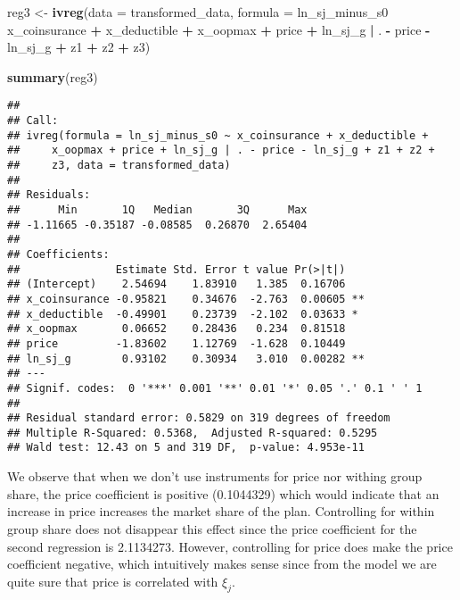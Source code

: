 \documentclass[]{article}
\newenvironment{Shaded}{\begin{snugshade}}{\end{snugshade}}
\newcommand{\DataTypeTok}[1]{\textcolor[rgb]{0.13,0.29,0.53}{#1}}
\newcommand{\KeywordTok}[1]{\textcolor[rgb]{0.13,0.29,0.53}{\textbf{#1}}}
\newcommand{\NormalTok}[1]{#1}
\newcommand{\OperatorTok}[1]{\textcolor[rgb]{0.81,0.36,0.00}{\textbf{#1}}}
\newcommand{\StringTok}[1]{\textcolor[rgb]{0.31,0.60,0.02}{#1}}
\begin{document}
\begin{Shaded}
\begin{Highlighting}[]
\NormalTok{reg3 <-}\StringTok{ }\KeywordTok{ivreg}\NormalTok{(}\DataTypeTok{data =}\NormalTok{ transformed_data, }
      \DataTypeTok{formula =}\NormalTok{ ln_sj_minus_s0 }\OperatorTok{~}\StringTok{ }\NormalTok{x_coinsurance }\OperatorTok{+}\StringTok{ }\NormalTok{x_deductible }\OperatorTok{+}\StringTok{ }\NormalTok{x_oopmax }\OperatorTok{+}\StringTok{ }\NormalTok{price }\OperatorTok{+}\StringTok{ }\NormalTok{ln_sj_g }\OperatorTok{|}\StringTok{ }\NormalTok{. }\OperatorTok{-}\StringTok{ }\NormalTok{price }\OperatorTok{-}\StringTok{ }\NormalTok{ln_sj_g }\OperatorTok{+}\StringTok{ }\NormalTok{z1 }\OperatorTok{+}\StringTok{ }\NormalTok{z2 }\OperatorTok{+}\StringTok{ }\NormalTok{z3)}

\KeywordTok{summary}\NormalTok{(reg3)}
\end{Highlighting}
\end{Shaded}

\begin{verbatim}
## 
## Call:
## ivreg(formula = ln_sj_minus_s0 ~ x_coinsurance + x_deductible + 
##     x_oopmax + price + ln_sj_g | . - price - ln_sj_g + z1 + z2 + 
##     z3, data = transformed_data)
## 
## Residuals:
##      Min       1Q   Median       3Q      Max 
## -1.11665 -0.35187 -0.08585  0.26870  2.65404 
## 
## Coefficients:
##               Estimate Std. Error t value Pr(>|t|)   
## (Intercept)    2.54694    1.83910   1.385  0.16706   
## x_coinsurance -0.95821    0.34676  -2.763  0.00605 **
## x_deductible  -0.49901    0.23739  -2.102  0.03633 * 
## x_oopmax       0.06652    0.28436   0.234  0.81518   
## price         -1.83602    1.12769  -1.628  0.10449   
## ln_sj_g        0.93102    0.30934   3.010  0.00282 **
## ---
## Signif. codes:  0 '***' 0.001 '**' 0.01 '*' 0.05 '.' 0.1 ' ' 1
## 
## Residual standard error: 0.5829 on 319 degrees of freedom
## Multiple R-Squared: 0.5368,  Adjusted R-squared: 0.5295 
## Wald test: 12.43 on 5 and 319 DF,  p-value: 4.953e-11
\end{verbatim}

We observe that when we don't use instruments for price nor withing
group share, the price coefficient is positive (0.1044329) which would
indicate that an increase in price increases the market share of the
plan. Controlling for within group share does not disappear this effect
since the price coefficient for the second regression is 2.1134273.
However, controlling for price does make the price coefficient negative,
which intuitively makes sense since from the model we are quite sure
that price is correlated with \(\xi_j\).
\end{document}
